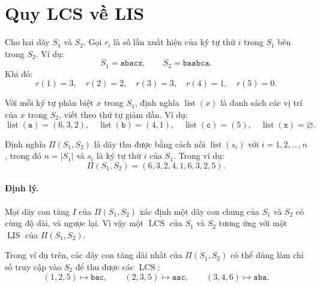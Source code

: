 \documentclass[11pt]{article}
\newcommand{\LCS}{\operatorname{LCS}}
\newcommand{\LIS}{\operatorname{LIS}}
\begin{document}
\section{Quy LCS về LIS}

Cho hai dãy \(S_1\) và \(S_2\). Gọi \(r_i\) là số lần xuất hiện của ký tự thứ
\(i\) trong \(S_1\) bên trong \(S_2\). Ví dụ:
\[
  S_1=\texttt{abacx},\qquad S_2=\texttt{baabca}.
\]
Khi đó:
\[
  r(1)=3,\quad r(2)=2,\quad r(3)=3,\quad r(4)=1,\quad r(5)=0.
\]

Với mỗi ký tự phân biệt \(x\) trong \(S_1\), định nghĩa \(\operatorname{list}(x)\)
là danh sách các vị trí của \(x\) trong \(S_2\), viết theo thứ tự giảm dần. Ví
dụ:
\[
  \operatorname{list}(\texttt{a})=(6,3,2),\quad
  \operatorname{list}(\texttt{b})=(4,1),\quad
  \operatorname{list}(\texttt{c})=(5),\quad
  \operatorname{list}(\texttt{x})=\varnothing.
\]

Định nghĩa \(\Pi(S_1,S_2)\) là dãy thu được bằng cách nối
\(\operatorname{list}(s_i)\) với \(i=1,2,\ldots,n\), trong đó \(n=|S_1|\) và
\(s_i\) là ký tự thứ \(i\) của \(S_1\). Trong ví dụ:
\[
  \Pi(S_1,S_2)=(6,3,2,4,1,6,3,2,5).
\]

\paragraph{Định lý.}
Mọi dãy con tăng \(I\) của \(\Pi(S_1,S_2)\) xác định một dãy con chung của
\(S_1\) và \(S_2\) có cùng độ dài, và ngược lại. Vì vậy một \(\LCS\) của
\(S_1\) và \(S_2\) tương ứng với một \(\LIS\) của \(\Pi(S_1,S_2)\).

Trong ví dụ trên, các dãy con tăng dài nhất của
\(\Pi(S_1,S_2)\) có thể dùng làm chỉ số truy cập vào \(S_2\) để thu được các
\(\LCS\):
\[
  (1,2,5)\mapsto\texttt{bac},\qquad
  (2,3,5)\mapsto\texttt{aac},\qquad
  (3,4,6)\mapsto\texttt{aba}.
\]
\end{document}
